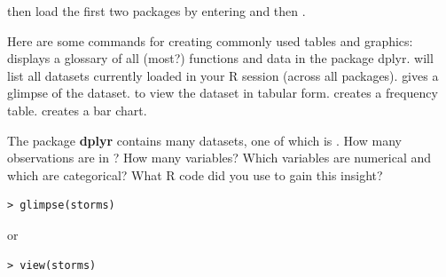 then load the first two packages by entering \textbf{} and then \textbf{}.

\bigskip

\bbox
Here are some commands for creating commonly used tables and graphics:
\bi
\ii \textbf{} displays a glossary of all (most?) functions and data in the package dplyr.
\ii \textbf{} will list all datasets currently loaded in your R session (across all packages).
\ii \textbf{} gives a glimpse of the dataset.
\ii \textbf{} to view the dataset in tabular form.
\ii \textbf{} creates a frequency table.
\ii \textbf{} creates a bar chart.
\ei
\ebox

\bb
\ii The package \textbf{dplyr} contains many datasets, one of which is \textbf{} . How many observations are in  \textbf{}? How many variables? Which variables are numerical and which are categorical? What R code did you use to gain this insight?

\begin{multicols}{2}

\begin{lstlisting}
> glimpse(storms)
\end{lstlisting}

or

\begin{lstlisting}
> view(storms)
\end{lstlisting}

\columnbreak

\small{}

\end{multicols}

